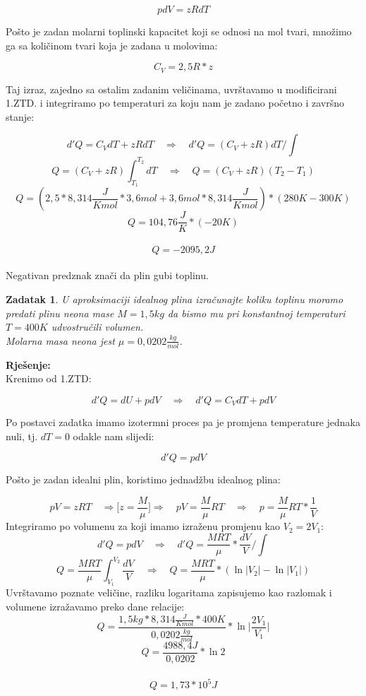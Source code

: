 \documentclass[a4paper,12pt]{article}
\newtheorem{ZDK}{Zadatak}[section]
\begin{document}
$$ pdV=zRdT  $$
 
Po\v{s}to je zadan molarni toplinski kapacitet koji se odnosi na mol tvari, mno\v{z}imo ga sa koli\v{c}inom tvari koja je zadana u molovima:

$$ C_V=2,5R*z $$

Taj izraz, zajedno sa ostalim zadanim veli\v{c}inama, uvr\v{s}tavamo u modificirani 1.ZTD. i integriramo po temperaturi za koju nam je zadano po\v{c}etno i zavr\v{s}no stanje:

$$ d'Q=C_VdT+zRdT \quad \Rightarrow \quad d'Q=(C_V+zR)dT \Big/ \int $$
$$ Q=(C_V+zR)\int_{T_1}^{T_2}dT \quad \Rightarrow \quad Q=(C_V+zR)(T_2-T_1) $$
$$ Q=(2,5*8,314\frac{J}{Kmol}*3,6 mol+3,6 mol*8,314\frac{J}{Kmol})*(280 K-300 K) $$
$$ Q=104,76\frac{J}{K}*(-20 K) $$
\\
$$ Q=-2095,2 J $$
\\
Negativan predznak zna\v{c}i da plin gubi toplinu.

\newpage
\begin{ZDK}
	U aproksimaciji idealnog plina izra\v{c}unajte koliku toplinu moramo predati plinu neona mase $M=1,5kg$ da bismo mu pri konstantnoj temperaturi
	$T=400K$ udvostru\v{c}ili volumen. \\ 
	Molarna masa neona jest $\mu=0,0202\frac{kg}{mol}$.
\end{ZDK}
\textbf{Rje\v{s}enje:} \\
\newline
Krenimo od 1.ZTD:

$$ d'Q=dU+pdV \quad \Rightarrow \quad d'Q=C_VdT+pdV $$

Po postavci zadatka imamo izotermni proces pa je promjena temperature jednaka nuli, tj. $dT=0$ odakle nam slijedi:

$$ d'Q=pdV $$

Po\v{s}to je zadan idealni plin, koristimo jednad\v{z}bu idealnog plina:

$$ pV=zRT \quad \Rightarrow \Big[ z=\frac{M}{\mu} \Big] \Rightarrow \quad pV=\frac{M}{\mu}RT \quad \Rightarrow \quad p=\frac{M}{\mu}RT*\frac{1}{V} $$
Integriramo po volumenu za koji imamo izra\v{z}enu promjenu kao $V_2=2V_1$:
$$ d'Q=pdV \quad \Rightarrow \quad d'Q=\frac{MRT}{\mu}*\frac{dV}{V} \Big/ \int $$
$$ Q=\frac{MRT}{\mu}\int_{V_1}^{V_2}\frac{dV}{V} \quad \Rightarrow \quad Q=\frac{MRT}{\mu}*(\ln{|V_2|-\ln{|V_1|}}) $$
Uvr\v{s}tavamo poznate veli\v{c}ine, razliku logaritama zapisujemo kao razlomak i volumene izra\v{z}avamo preko dane relacije:
$$ Q=\frac{1,5 kg*8,314\frac{J}{Kmol}*400 K}{0,0202\frac{kg}{mol}}*\ln{\Big| \frac{2V_1}{V_1}  \Big|} $$
$$ Q=\frac{4988,4 J}{0,0202}*\ln{2} $$
\\
$$ Q=1,73*10^5 J $$
\end{document}
